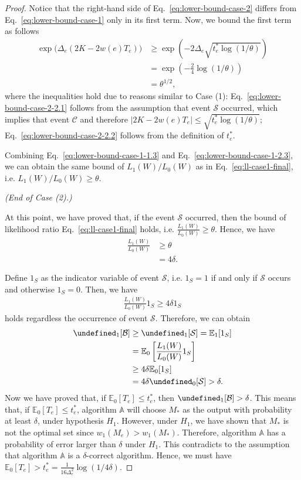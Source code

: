 \documentclass{article}
\newcommand{\E}{\mathbb E}
\let\Pr\undefined
\DeclareMathOperator{\Pr}{Pr}
\begin{document}
\begin{spacing}{1.1}
\begin{proof}
Notice that the right-hand side of Eq.~\eqref{eq:lower-bound-case-2} differs from Eq.~\eqref{eq:lower-bound-case-1} only in its first term.
Now, we bound the first term as follows
\begin{align}
	\exp\big(\Delta_e(2K-2w(e)T_e)\big) & \ge \exp\left(-2\Delta_e\sqrt{t_e^*\log(1/\theta)}\right) \label{eq:lower-bound-case-2-2.1}\\
								       & = \exp\left(-\frac{2}{4}\log(1/\theta)\right) \label{eq:lower-bound-case-2-2.2}\\
								       &=\theta^{1/2},  \label{eq:lower-bound-case-2-2.3}
\end{align}
where the inequalities hold due to reasons similar to Case (1): Eq.~\eqref{eq:lower-bound-case-2-2.1} follows from the assumption that event $\mathcal S$ occurred, which implies that event $\mathcal C$ and therefore $|2K-2w(e)T_e| \le \sqrt{t_e^*\log(1/\theta)}$; 
Eq.~\eqref{eq:lower-bound-case-2-2.2} follows from the definition of $t_e^*$.

Combining Eq.~\eqref{eq:lower-bound-case-1-1.3} and Eq.~\eqref{eq:lower-bound-case-1-2.3}, we  can obtain the same bound of $L_1(W)/L_0(W)$ as in Eq.~\eqref{eq:ll-case1-final}, i.e. $L_1(W)/L_0(W) \ge \theta$.

\emph{(End of Case (2).)}

At this point, we have proved that, if the event $\mathcal S$ occurred, then the bound of likelihood ratio Eq.~\eqref{eq:ll-case1-final} holds, i.e. $\frac{L_1(W)}{L_0(W)} \ge \theta$.
Hence, we have
\begin{align}
\frac{L_1(W)}{L_0(W)} &\ge \theta \nonumber \\
					  &= 4\delta.	
\end{align}


Define $1_S$ as the indicator variable of event $\mathcal S$, i.e. $1_S = 1$ if and only if $\mathcal S$ occurs and otherwise $1_S = 0$.
Then, we have
\begin{align*}
\frac{L_1(W)}{L_0(W)} 1_S \ge 4\delta 1_S
\end{align*}
holds regardless the occurrence of event $\mathcal S$.
Therefore, we can obtain
\begin{align*}
\Pr_1[\mathcal B] &\ge \Pr_1[\mathcal S] = \E_1[1_S] \\
				  &= \E_0\left[\frac{L_1(W)}{L_0(W)} 1_S\right] \\
				  &\ge 4\delta \E_0[1_S] \\
				  &= 4\delta \Pr_0[\mathcal S] > \delta.
\end{align*}
Now we have proved that, if $\E_0[T_e] \le t_e^*$, then $\Pr_1[\mathcal B]>\delta$.
This means that, if $\E_0[T_e] \le t_e^*$, algorithm $\mathbb A$ will choose $M_*$ as the output with probability at least $\delta$, under hypothesis $H_1$.
However, under $H_1$, we have shown that $M_*$ is not the optimal set since $w_1(M_e) > w_1(M_*)$.
Therefore, algorithm $\mathbb A$ has a probability of error larger than $\delta$ under $H_1$. 
This contradicts to the assumption that algorithm $\mathbb A$ is a $\delta$-correct algorithm.
Hence, we must have $\E_0[T_e] > t_e^* = \frac{1}{16\Delta_e^2}\log(1/4\delta)$.


\end{proof}
\end{spacing}
\end{document}
